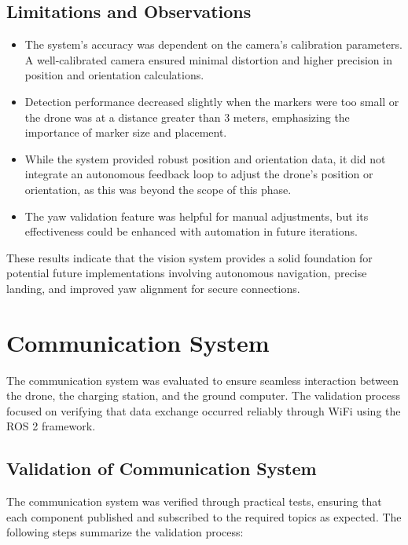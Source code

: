 \subsection{Limitations and Observations}
\begin{itemize}
    \item The system's accuracy was dependent on the camera's calibration parameters. A well-calibrated camera ensured minimal distortion and higher precision in position and orientation calculations.
    \item Detection performance decreased slightly when the markers were too small or the drone was at a distance greater than 3 meters, emphasizing the importance of marker size and placement.
    \item While the system provided robust position and orientation data, it did not integrate an autonomous feedback loop to adjust the drone's position or orientation, as this was beyond the scope of this phase.
    \item The yaw validation feature was helpful for manual adjustments, but its effectiveness could be enhanced with automation in future iterations.
\end{itemize}

These results indicate that the vision system provides a solid foundation for potential future implementations involving autonomous navigation, precise landing, and improved yaw alignment for secure connections.

\section{Communication System}

The communication system was evaluated to ensure seamless interaction between the drone, the charging station, and the ground computer. The validation process focused on verifying that data exchange occurred reliably through WiFi using the ROS 2 framework.

\subsection{Validation of Communication System}

The communication system was verified through practical tests, ensuring that each component published and subscribed to the required topics as expected. The following steps summarize the validation process:

